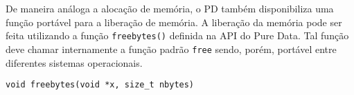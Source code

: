 De maneira análoga a alocação de memória, o PD também disponibiliza uma função
portável para a liberação de memória.
A liberação da memória pode ser feita utilizando a função \texttt{freebytes()}
definida na API do Pure Data.
Tal função deve chamar internamente a função padrão \texttt{free} sendo, porém,
portável entre diferentes sistemas operacionais.

\begin{lstlisting}
void freebytes(void *x, size_t nbytes)
\end{lstlisting}
